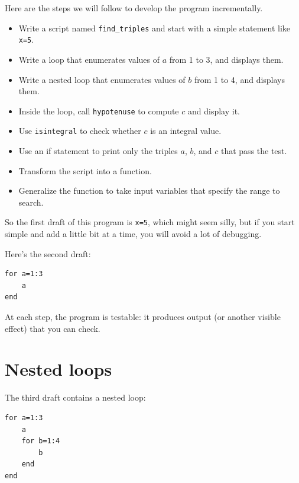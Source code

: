 \documentclass[
]{book}
\begin{document}
Here are the steps we will follow to develop the program incrementally.

\begin{itemize}

\item Write a script named {\tt find\_triples} and start with a simple
statement like {\tt x=5}.

\item Write a loop that enumerates values of $a$ from 1 to 3, and
displays them.

\item Write a nested loop that enumerates values of $b$ from 1 to 4,
and displays them.

\item Inside the loop, call {\tt hypotenuse} to compute $c$ and
display it.

\item Use {\tt isintegral} to check whether $c$ is an integral
value.

\item Use an if statement to print only the triples $a$, $b$, and $c$
that pass the test.

\item Transform the script into a function.

\item Generalize the function to take input variables that
specify the range to search.

\end{itemize}

So the first draft of this program is {\tt x=5}, which might seem
silly, but if you start simple and add a little bit at a time, you
will avoid a lot of debugging.

Here's the second draft:

\begin{verbatim}
for a=1:3
    a
end
\end{verbatim}

At each step, the program is testable: it produces output (or another
visible effect) that you can check.


\section{Nested loops}

The third draft contains a nested loop:

\begin{verbatim}
for a=1:3
    a
    for b=1:4
        b
    end
end
\end{verbatim}
\end{document}
